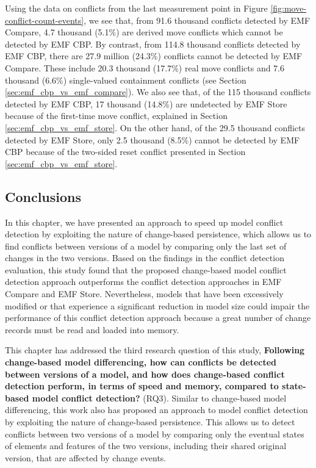 Using the data on conflicts from the last measurement point in Figure \ref{fig:move-conflict-count-events}, we see that, from 91.6 thousand conflicts detected by EMF Compare, 4.7 thousand (5.1\%) are derived move conflicts which cannot be detected by EMF CBP. By contrast, from 114.8 thousand conflicts detected by EMF CBP, there are 27.9 million (24.3\%) conflicts cannot be detected by EMF Compare. These include 20.3 thousand (17.7\%) real move conflicts and 7.6 thousand (6.6\%) single-valued containment conflicts (see Section \ref{sec:emf_cbp_vs_emf_compare}). We also see that, of the 115 thousand conflicts detected by EMF CBP, 17 thousand (14.8\%) are undetected by EMF Store because of the first-time move conflict, explained in Section \ref{sec:emf_cbp_vs_emf_store}. On the other hand, of the 29.5 thousand conflicts detected by EMF Store, only 2.5 thousand (8.5\%) cannot be detected by EMF CBP because of the two-sided reset conflict presented in Section \ref{sec:emf_cbp_vs_emf_store}.

\subsection{Conclusions}
\label{sec:conclusions_7}
In this chapter, we have presented an approach to speed up model conflict detection by exploiting the nature of change-based persistence, which allows us to find conflicts between versions of a model by comparing only the last set of changes in the two versions. Based on the findings in the conflict detection evaluation, this study found that the proposed change-based model conflict detection approach outperforms the conflict detection approaches in EMF Compare and EMF Store. Nevertheless, models that have been excessively modified or that experience a significant reduction in model size could impair the performance of this conflict detection approach because a great number of change records must be read and loaded into memory.

This chapter has addressed the third research question of this study, \textbf{Following change-based model differencing, how can conflicts be detected between versions of a model, and how does change-based conflict detection perform, in terms of speed and memory, compared to state-based model conflict detection?} (RQ3). Similar to change-based model differencing, this work also has proposed an approach to model conflict detection by exploiting the nature of change-based persistence. This allows us to detect conflicts between two versions of a model by comparing only the eventual states of elements and features of the two versions, including their shared original version, that are affected by change events.

